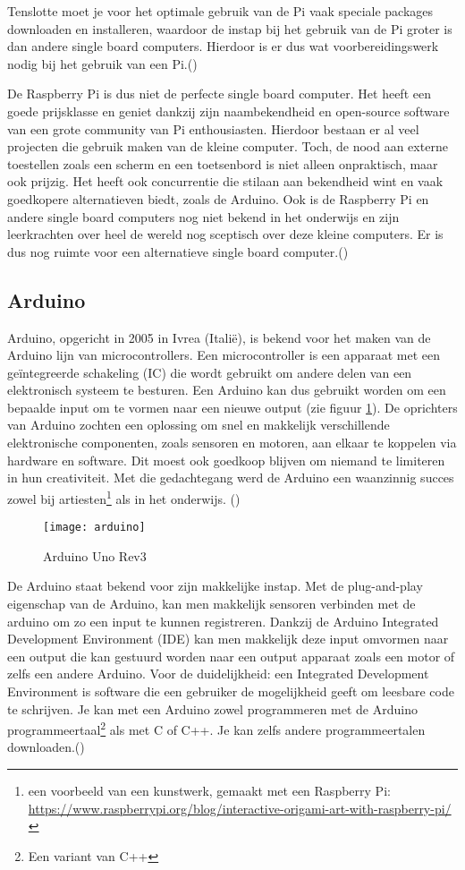 Tenslotte moet je voor het optimale gebruik van de Pi vaak speciale packages downloaden en installeren, waardoor de instap bij het gebruik van de Pi groter is dan andere single board computers. Hierdoor is er dus wat voorbereidingswerk nodig bij het gebruik van een Pi.(\cite{Teja2021})

De Raspberry Pi is dus niet de perfecte single board computer. Het heeft een goede prijsklasse en geniet dankzij zijn naambekendheid en open-source software van een grote community van Pi enthousiasten. Hierdoor bestaan er al veel projecten die gebruik maken van de kleine computer. Toch, de nood aan externe toestellen zoals een scherm en een toetsenbord is niet alleen onpraktisch, maar ook prijzig. Het heeft ook concurrentie die stilaan aan bekendheid wint en vaak goedkopere alternatieven biedt, zoals de Arduino. Ook is de Raspberry Pi en andere single board computers nog niet bekend in het onderwijs en zijn leerkrachten over heel de wereld nog sceptisch over deze kleine computers. Er is dus nog ruimte voor een alternatieve single board computer.(\cite{Susan2014})

\subsection{Arduino}

Arduino, opgericht in 2005 in Ivrea (Italië), is bekend voor het maken van de Arduino lijn van microcontrollers. Een microcontroller is een apparaat met een geïntegreerde schakeling (IC) die wordt gebruikt om andere delen van een elektronisch systeem te besturen. Een Arduino kan dus gebruikt worden om een bepaalde input om te vormen naar een nieuwe output (zie figuur \ref{fig:arduino1}). De oprichters van Arduino zochten een oplossing om snel en makkelijk verschillende elektronische componenten, zoals sensoren en motoren, aan elkaar te koppelen via hardware en software. Dit moest ook goedkoop blijven om niemand te limiteren in hun creativiteit. Met die gedachtegang werd de Arduino een waanzinnig succes zowel bij artiesten\footnote{een voorbeeld van een kunstwerk, gemaakt met een Raspberry Pi: \url{https://www.raspberrypi.org/blog/interactive-origami-art-with-raspberry-pi/}} als in het onderwijs. (\cite{Hughes})


\begin{figure}
    \texttt{[image: arduino]}
    \caption{Arduino Uno Rev3}
    \label{fig:arduino1}
\end{figure}

De Arduino staat bekend voor zijn makkelijke instap. Met de plug-and-play eigenschap van de Arduino, kan men makkelijk sensoren verbinden met de arduino om zo een input te kunnen registreren. Dankzij de Arduino Integrated Development Environment (IDE) kan men makkelijk deze input omvormen naar een output die kan gestuurd worden naar een output apparaat zoals een motor of zelfs een andere Arduino. Voor de duidelijkheid: een Integrated Development Environment is software die een gebruiker de mogelijkheid geeft om leesbare code te schrijven. Je kan met een Arduino zowel programmeren met de Arduino programmeertaal\footnote{Een variant van C++} als met C of C++. Je kan zelfs andere programmeertalen downloaden.(\cite{Teja2021})

